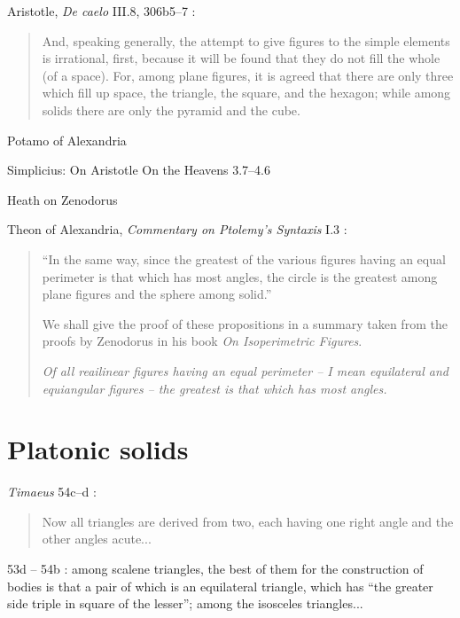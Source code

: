 \documentclass{article}
\begin{document}
Aristotle, {\em De caelo} III.8, 306b5--7 \cite[p.~177]{aristotle}:

\begin{quote}
And, speaking generally, the attempt to give figures to the simple
elements is irrational, first, because it will be found that they do
not fill the whole (of a space). For, among plane figures, it is agreed
that there are only three which fill up space, the triangle, the square,
and the hexagon; while among solids there are only the pyramid
and the cube.
\end{quote}

Potamo of Alexandria

Simplicius: On Aristotle On the Heavens 3.7--4.6

Heath \cite[pp.~206--213]{HGMII} on Zenodorus

Theon of Alexandria, {\em Commentary on Ptolemy's Syntaxis} I.3 \cite[pp.~386--391]{LCL362}:

\begin{quote}
``In the same way, since the greatest of the various
figures having an equal perimeter is that which has most angles, the circle is the greatest among plane
figures and the sphere among solid.''

We shall give the proof of these propositions in a summary taken from the proofs by Zenodorus
in his book {\em On Isoperimetric Figures}.

{\em Of all reailinear figures having an equal perimeter -- I mean equilateral and equiangular figures -- 
the greatest is that which has most angles.}
\end{quote}









\section{Platonic solids}
{\em Timaeus} 54c--d \cite[p.~212]{timaeus}: 

\begin{quote}
Now all triangles are derived from two, each having one right angle and the other angles acute...
\end{quote}

53d -- 54b \cite[pp.~213--214]{timaeus}: among scalene triangles, the best of them for the construction of bodies is that a pair of which is an equilateral triangle, which has ``the greater
side triple in square of the lesser''; among the isosceles triangles...
\end{document}
